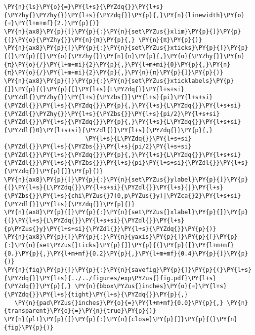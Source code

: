 \begin{Verbatim}[commandchars=\\\{\}]
           \PY{n}{ls}\PY{o}{=}\PY{l+s}{\PYZdq{}}\PY{l+s}{\PYZhy{}\PYZhy{}}\PY{l+s}{\PYZdq{}}\PY{p}{,}\PY{n}{linewidth}\PY{o}{=}\PY{l+m+mf}{2.}\PY{p}{)}
\PY{n}{ax8}\PY{p}{[}\PY{p}{:}\PY{n}{set\PYZus{}xlim}\PY{p}{]}\PY{p}{(}\PY{o}{\PYZhy{}}\PY{n}{π}\PY{p}{,} \PY{n}{π}\PY{p}{)}
\PY{n}{ax8}\PY{p}{[}\PY{p}{:}\PY{n}{set\PYZus{}xticks}\PY{p}{]}\PY{p}{(}\PY{p}{[}\PY{o}{\PYZhy{}}\PY{n}{π}\PY{p}{,}\PY{o}{\PYZhy{}}\PY{n}{π}\PY{o}{/}\PY{l+m+mi}{2}\PY{p}{,}\PY{l+m+mi}{0}\PY{p}{,}\PY{n}{π}\PY{o}{/}\PY{l+m+mi}{2}\PY{p}{,}\PY{n}{π}\PY{p}{]}\PY{p}{)}
\PY{n}{ax8}\PY{p}{[}\PY{p}{:}\PY{n}{set\PYZus{}xticklabels}\PY{p}{]}\PY{p}{(}\PY{p}{[}\PY{l+s}{L\PYZdq{}}\PY{l+s+si}{\PYZdl{}\PYZhy{}}\PY{l+s}{\PYZbs{}}\PY{l+s}{pi}\PY{l+s+si}{\PYZdl{}}\PY{l+s}{\PYZdq{}}\PY{p}{,}\PY{l+s}{L\PYZdq{}}\PY{l+s+si}{\PYZdl{}\PYZhy{}}\PY{l+s}{\PYZbs{}}\PY{l+s}{pi/2}\PY{l+s+si}{\PYZdl{}}\PY{l+s}{\PYZdq{}}\PY{p}{,}\PY{l+s}{L\PYZdq{}}\PY{l+s+si}{\PYZdl{}0}\PY{l+s+si}{\PYZdl{}}\PY{l+s}{\PYZdq{}}\PY{p}{,}
                       \PY{l+s}{L\PYZdq{}}\PY{l+s+si}{\PYZdl{}}\PY{l+s}{\PYZbs{}}\PY{l+s}{pi/2}\PY{l+s+si}{\PYZdl{}}\PY{l+s}{\PYZdq{}}\PY{p}{,}\PY{l+s}{L\PYZdq{}}\PY{l+s+si}{\PYZdl{}}\PY{l+s}{\PYZbs{}}\PY{l+s}{pi}\PY{l+s+si}{\PYZdl{}}\PY{l+s}{\PYZdq{}}\PY{p}{]}\PY{p}{)}
\PY{n}{ax8}\PY{p}{[}\PY{p}{:}\PY{n}{set\PYZus{}ylabel}\PY{p}{]}\PY{p}{(}\PY{l+s}{L\PYZdq{}}\PY{l+s+si}{\PYZdl{}}\PY{l+s}{|}\PY{l+s}{\PYZbs{}}\PY{l+s}{chi\PYZus{}7(0,p\PYZus{}y)|\PYZca{}2}\PY{l+s+si}{\PYZdl{}}\PY{l+s}{\PYZdq{}}\PY{p}{)}
\PY{n}{ax8}\PY{p}{[}\PY{p}{:}\PY{n}{set\PYZus{}xlabel}\PY{p}{]}\PY{p}{(}\PY{l+s}{L\PYZdq{}}\PY{l+s+si}{\PYZdl{}}\PY{l+s}{p\PYZus{}y}\PY{l+s+si}{\PYZdl{}}\PY{l+s}{\PYZdq{}}\PY{p}{)}
\PY{n}{ax8}\PY{p}{[}\PY{p}{:}\PY{n}{yaxis}\PY{p}{]}\PY{p}{[}\PY{p}{:}\PY{n}{set\PYZus{}ticks}\PY{p}{]}\PY{p}{(}\PY{p}{[}\PY{l+m+mf}{0.}\PY{p}{,}\PY{l+m+mf}{0.2}\PY{p}{,}\PY{l+m+mf}{0.4}\PY{p}{]}\PY{p}{)}
\PY{n}{fig}\PY{p}{[}\PY{p}{:}\PY{n}{savefig}\PY{p}{]}\PY{p}{(}\PY{l+s}{\PYZdq{}}\PY{l+s}{../../figures/exp\PYZus{}fig.pdf}\PY{l+s}{\PYZdq{}}\PY{p}{,} \PY{n}{bbox\PYZus{}inches}\PY{o}{=}\PY{l+s}{\PYZdq{}}\PY{l+s}{tight}\PY{l+s}{\PYZdq{}}\PY{p}{,}
   \PY{n}{pad\PYZus{}inches}\PY{o}{=}\PY{l+m+mf}{0.0}\PY{p}{,} \PY{n}{transparent}\PY{o}{=}\PY{n}{true}\PY{p}{)}
\PY{n}{plt}\PY{p}{[}\PY{p}{:}\PY{n}{close}\PY{p}{]}\PY{p}{(}\PY{n}{fig}\PY{p}{)}
\end{Verbatim}
